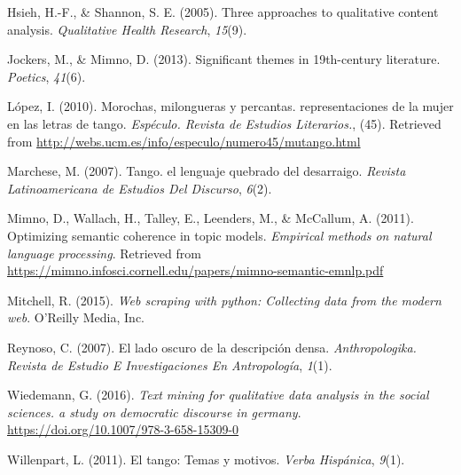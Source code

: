 \documentclass[]{article}
\begin{document}
\hypertarget{ref-fang}{}
Hsieh, H.-F., \& Shannon, S. E. (2005). Three approaches to qualitative
content analysis. \emph{Qualitative Health Research}, \emph{15}(9).

\hypertarget{ref-jockers}{}
Jockers, M., \& Mimno, D. (2013). Significant themes in 19th-century
literature. \emph{Poetics}, \emph{41}(6).

\hypertarget{ref-lopez_i}{}
López, I. (2010). Morochas, milongueras y percantas. representaciones de
la mujer en las letras de tango. \emph{Espéculo. Revista de Estudios
Literarios.}, (45). Retrieved from
\url{http://webs.ucm.es/info/especulo/numero45/mutango.html}

\hypertarget{ref-marchese1}{}
Marchese, M. (2007). Tango. el lenguaje quebrado del desarraigo.
\emph{Revista Latinoamericana de Estudios Del Discurso}, \emph{6}(2).

\hypertarget{ref-mimno}{}
Mimno, D., Wallach, H., Talley, E., Leenders, M., \& McCallum, A.
(2011). Optimizing semantic coherence in topic models. \emph{Empirical
methods on natural language processing}. Retrieved from
\url{https://mimno.infosci.cornell.edu/papers/mimno-semantic-emnlp.pdf}

\hypertarget{ref-mitchell}{}
Mitchell, R. (2015). \emph{Web scraping with python: Collecting data
from the modern web}. O'Reilly Media, Inc.

\hypertarget{ref-reynoso1}{}
Reynoso, C. (2007). El lado oscuro de la descripción densa.
\emph{Anthropologika. Revista de Estudio E Investigaciones En
Antropología}, \emph{1}(1).

\hypertarget{ref-wind}{}
Wiedemann, G. (2016). \emph{Text mining for qualitative data analysis in
the social sciences. a study on democratic discourse in germany}.
\url{https://doi.org/10.1007/978-3-658-15309-0}

\hypertarget{ref-willenpart}{}
Willenpart, L. (2011). El tango: Temas y motivos. \emph{Verba
Hispánica}, \emph{9}(1).
\end{document}
